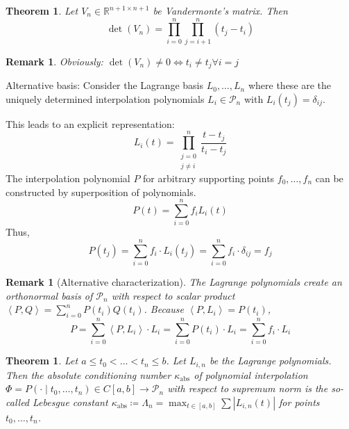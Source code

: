 \documentclass[a4paper]{article}
\newcounter{lecref}[section]
\numberwithin{lecref}{section}
\theoremstyle{break}
\newtheorem{thm}[lecref]{Theorem}
\newtheorem{remark}[lecref]{Remark}
\newcommand{\Abs}[1]{\left|#1\right|}
\newcommand{\IP}[2]{\left\langle#1, #2\right\rangle}
\begin{document}
\begin{thm}
  \label{theorem:4-2}
  Let $V_n \in \mathbb R^{n + 1 \times n + 1}$ be Vandermonte's matrix. Then
  \[ \det(V_n) = \prod_{i=0}^n \prod_{j=i+1}^n (t_j - t_i) \]
\end{thm}

\begin{remark}
  \label{remark:4-3}
  Obviously: $\det(V_n) \neq 0 \iff t_i \neq t_j \forall i = j$
\end{remark}

Alternative basis: Consider the Lagrange basis $L_0, \dots, L_n$ where
these are the uniquely determined interpolation polynomials $L_i \in \mathcal P_n$
with $L_i(t_j) = \delta_{ij}$.

This leads to an explicit representation:
\[ L_i(t) = \prod_{\substack{j=0 \\ j \neq i}}^n \frac{t - t_j}{t_i - t_j} \]
The interpolation polynomial $P$ for arbitrary supporting points $f_0, \dots, f_n$ can be constructed by superposition of polynomials.
\[ P(t) = \sum_{i=0}^n f_i L_i(t) \]
Thus,
\[ P(t_j) = \sum_{i=0}^n f_i \cdot L_i(t_j) = \sum_{i=0}^n f_i \cdot \delta_{ij} = f_j \]

\begin{remark}[Alternative characterization]
  \label{remark:4-4}
  The Lagrange polynomials create an orthonormal basis of $\mathcal P_n$ with respect to scalar product $\IP PQ = \sum_{i=0}^n P(t_i) Q(t_i)$. Because $\IP P{L_i} = P(t_i)$,
  \[ P = \sum_{i=0}^n \IP P{L_i} \cdot L_i = \sum_{i=0}^n P(t_i) \cdot L_i = \sum_{i=0}^n f_i \cdot L_i \]
\end{remark}

\begin{thm}
  \label{theorem:4-5}
  Let $a \leq t_0 < \dots < t_n \leq b$.
  Let $L_{i,n}$ be the Lagrange polynomials.
  Then the absolute conditioning number $\kappa_{\operatorname{abs}}$ of polynomial interpolation
  $\Phi = P(\cdot \mid t_0, \dots, t_n) \in C[a, b] \to \mathcal P_n$ with respect to supremum norm
  is the so-called \emph{Lebesgue constant} $\kappa_{\operatorname{abs}} \coloneqq \Lambda_n = \max_{t \in [a,b]} \sum \Abs{L_{i,n}(t)}$ for points $t_0, \dots, t_n$.
\end{thm}
\end{document}
